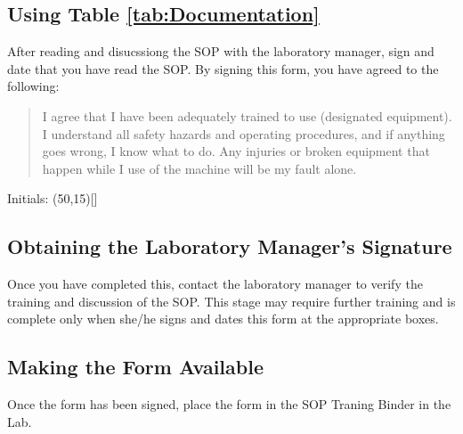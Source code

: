 \documentclass{article}\usepackage[]{graphicx}\usepackage[]{color}
\begin{document}
\subsection{Using Table \ref{tab:Documentation}}

After reading and disucssiong the SOP with the laboratory manager, sign and date that you have read the SOP. By signing this form, you have agreed to the following: 

\begin{quote} 
I agree that I have been adequately trained to use (designated equipment). I understand all safety hazards and operating procedures, and if anything goes wrong, I know what to do. Any injuries or broken equipment that happen while I use of the machine will be my fault alone.
\end{quote}

Initials: \framebox(50,15)[]{}

\subsection{Obtaining the Laboratory Manager's Signature}
Once you have completed this, contact the laboratory manager to verify the training and discussion of the SOP. This stage may require further training and is complete only when she/he signs and dates this form at the appropriate boxes. 

\subsection{Making the Form Available}

Once the form has been signed, place the form in the SOP Traning Binder in the Lab. 
\end{document}
